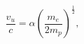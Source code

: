 \begin{equation}
\frac{v_u}{c}=\alpha\left(\frac{m_e}{2m_p}\right)^{\frac{1}{2}},
\label{v4}
\end{equation}

